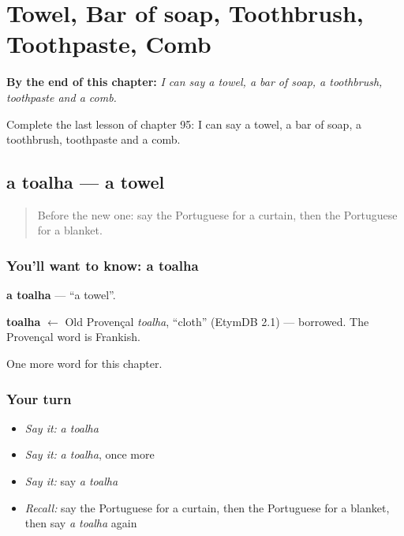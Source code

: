 
\chapter{Towel, Bar of soap, Toothbrush, Toothpaste, Comb}
\label{ch:pt-towel-bar-of-soap-toothbrush-toothpaste-comb}

\begin{chapteropening}
\textbf{By the end of this chapter:} \emph{I can say a towel, a bar of soap, a toothbrush, toothpaste and a comb.}

Complete the last lesson of chapter 95: I can say a towel, a bar of soap, a toothbrush, toothpaste and a comb.
\end{chapteropening}

\section[a toalha]{a toalha — a towel}

\label{lesson:PT-C95-toalha}



\begin{quote}
Before the new one: say the Portuguese for a curtain, then the Portuguese for a blanket.
\end{quote}

\subsection*{You'll want to know: a toalha}
\textbf{a toalha} — \textquotedblleft{}a towel\textquotedblright{}.

\begin{cousinweb}
\textbf{toalha} $\leftarrow$ Old Provençal \emph{toalha}, \textquotedblleft{}cloth\textquotedblright{} (EtymDB 2.1) — borrowed. The Provençal word is Frankish.
\end{cousinweb}

\begin{grammarlens}[title={What you've built}]
One more word for this chapter.
\end{grammarlens}

\subsection*{Your turn}
\begin{itemize}
\raggedright
  \item \emph{Say it:} \emph{a toalha}
  \item \emph{Say it:} \emph{a toalha}, once more
  \item \emph{Say it:} say \emph{a toalha}
  \item \emph{Recall:} say the Portuguese for a curtain, then the Portuguese for a blanket, then say \emph{a toalha} again
\end{itemize}

